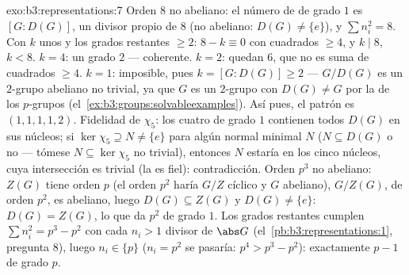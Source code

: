 \begin{solution}{exo:b3:representations:7}
Orden $8$ no abeliano: el número de
 de grado $1$ es
$[G : D(G)]$, un divisor propio de $8$ (no abeliano: $D(G) \neq
\{e\}$), y $\sum n_i^2 = 8$. Con $k$ unos y los grados restantes
$\geq 2$: $8 - k \equiv 0$ con cuadrados $\geq 4$, y $k
\mid 8$, $k < 8$. $k = 4$: un grado $2$ --- coherente. $k =
2$: quedan $6$, que no es suma de cuadrados $\geq 4$. $k = 1$:
imposible, pues $k = [G : D(G)] \geq 2$ --- $G/D(G)$ es un $2$-grupo
abeliano no trivial, ya que $G$ es un $2$-grupo con $D(G) \neq G$ por la
 de los $p$-grupos
(el~\cref{ex:b3:groups:solvableexamples}). Así pues, el patrón es
$(1,1,1,1,2)$. Fidelidad de $\chi_5$: los cuatro
 de grado $1$
contienen todos $D(G)$ en sus núcleos; si $\ker\chi_5
\supseteq N \neq \{e\}$ para algún normal minimal $N$ ($N
\subseteq D(G)$ o no --- tómese $N \subseteq \ker\chi_5$ no trivial),
entonces $N$ estaría en los cinco núcleos, cuya intersección es trivial
(la  es
fiel): contradicción. Orden $p^3$ no abeliano: $Z(G)$ tiene orden $p$
(el orden $p^2$ haría $G/Z$ cíclico y $G$ abeliano), $G/Z(G)$, de orden
$p^2$, es abeliano, luego $D(G) \subseteq Z(G)$ y $D(G) \ne \{e\}$:
$D(G) = Z(G)$, lo que da $p^2$
 de grado $1$. Los
grados restantes cumplen $\sum n_i^2 = p^3 -
p^2$ con cada $n_i > 1$ divisor de $\abs G$
(el~\cref{pb:b3:representations:1}, pregunta 8), luego $n_i \in
\{p\}$ ($n_i = p^2$ se pasaría: $p^4 > p^3 - p^2$): exactamente $p
- 1$  de grado $p$.
\end{solution}

